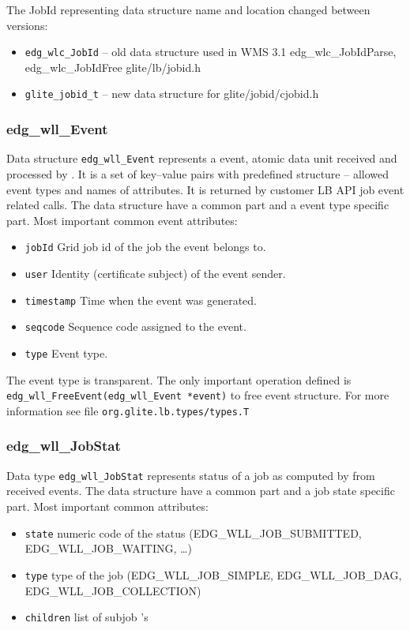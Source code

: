 The JobId representing data structure name and location
changed between \LB versions:

\begin{itemize}
 \item \texttt{edg\_wlc\_JobId} -- old data structure used in WMS 3.1
  edg\_wlc\_JobIdParse, edg\_wlc\_JobIdFree
  glite/lb/jobid.h 
 \item \texttt{glite\_jobid\_t} -- new data structure for  
  glite/jobid/cjobid.h
\end{itemize}

\subsubsection{edg\_wll\_Event}
Data structure \texttt{edg\_wll\_Event} represents a \LB event, atomic
data unit received and processed by \LB. It is a set of
key--value pairs with predefined structure -- allowed event types and
names of attributes. It is returned by customer LB API job event
related calls. The data structure have a common part and a event
type specific part. Most important common event attributes:
\begin{itemize}
  \item \texttt{jobId} Grid job id of the job the event belongs to.
  \item \texttt{user} Identity (certificate subject) of the event sender.
  \item \texttt{timestamp} Time when the event was generated.
  \item \texttt{seqcode} Sequence code assigned to the event.
  \item \texttt{type} Event type.
\end{itemize}

The event type is transparent. The only important operation defined is
\texttt{edg\_wll\_FreeEvent(edg\_wll\_Event *event)} to free event
structure. For more information see file \texttt{org.glite.lb.types/types.T} 


\subsubsection{edg\_wll\_JobStat}
Data type \texttt{edg\_wll\_JobStat} represents status of a job as
computed by \LB from received events. The data structure have a common
part and a job state specific part. Most important common
attributes:
\begin{itemize}
  \item \texttt{state} numeric code of the status
    (EDG\_WLL\_JOB\_SUBMITTED, EDG\_WLL\_JOB\_WAITING, \dots)
  \item \texttt{type} type of the job (EDG\_WLL\_JOB\_SIMPLE,
    EDG\_WLL\_JOB\_DAG, EDG\_WLL\_JOB\_COLLECTION) 
  \item \texttt{children} list of subjob \jobid's
\end{itemize}


